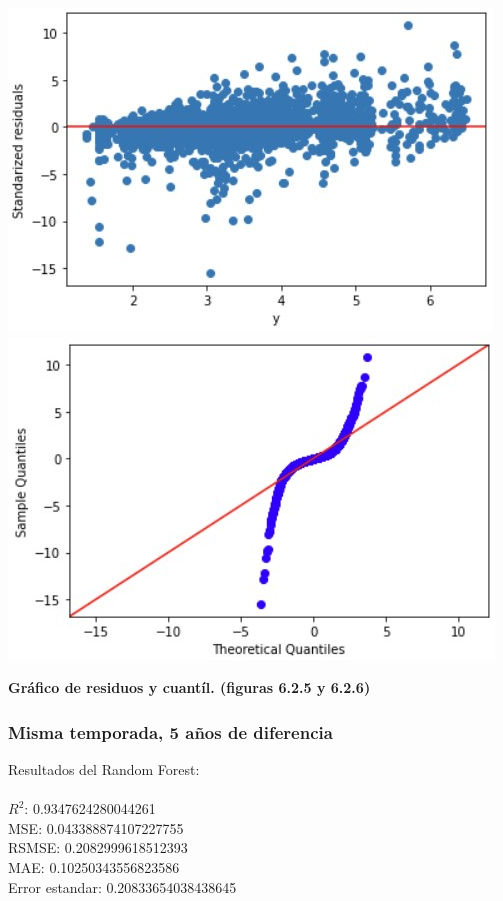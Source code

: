 \documentclass{article}
\begin{document}
                        \includegraphics[scale=0.6]{images/SVR_Stage_DS.jpg} 
                        \includegraphics[scale=0.6]{images/SVR_Stage_DS_Q.jpg}
                        \begin{center}
                            \textbf{Gráfico de residuos y cuantíl. (figuras 6.2.5 y 6.2.6)}
                        \end{center}
                        
        \subsubsection{Misma temporada, 5 años de diferencia}

            Resultados del Random Forest:\\
                    \\
                        $R^2$:  0.9347624280044261 \\
                        MSE:  0.043388874107227755 \\
                        RSMSE:  0.2082999618512393 \\
                        MAE:  0.10250343556823586 \\
                        Error estandar:  0.20833654038438645 \\
                
\end{document}
